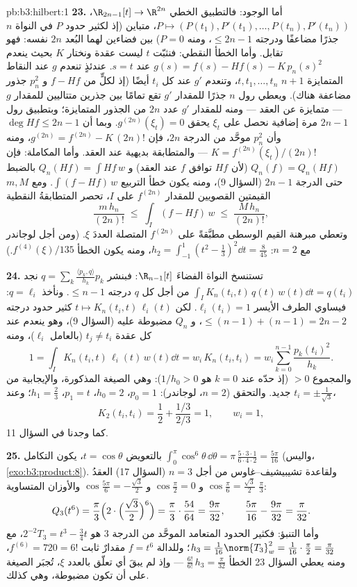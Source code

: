 \begin{solution}{pb:b3:hilbert:1}
\textbf{23.} أما الوجود: فالتطبيق الخطي $\R_{2n-1}[t] \to
\R^{2n}$، $P \mapsto (P(t_1), P'(t_1), \dots, P(t_n),
P'(t_n))$،
متباين (إذ لكثير حدود $P$ في النواة $n$ جذرًا مضاعفًا ودرجته
$\leq 2n - 1$، ومنه $P = 0$) بين فضاءين لهما البُعد $2n$ نفسه:
فهو تقابل. وأما الخطأ النقطي: فنثبّت $t$ ليست عقدة ونختار $K$
بحيث ينعدم $g(s) = f(s) - Hf(s) -
K\,p_n(s)^2$ عند $s = t$. عندئذٍ تنعدم $g$ عند النقاط
المتمايزة $n + 1$ $t, t_1, \dots, t_n$، وتنعدم $g'$ عند كل $t_i$ أيضًا
(إذ لكلٍّ من $f - Hf$ و $p_n^2$ جذور مضاعفة هناك). ويعطي رول
$n$ جذرًا للمقدار $g'$ تقع تمامًا بين جذرين متتاليين للمقدار
$g$ --- متمايزة عن العقد --- ومنه للمقدار $g'$ عدد $2n$ من الجذور
المتمايزة؛ وبتطبيق رول $2n - 1$ مرة إضافية نحصل على $\xi_t$
يحقق $g^{(2n)}(\xi_t) = 0$. وبما أن $\deg Hf \leq 2n - 1$ وأن $p_n^2$ موحَّد من الدرجة
$2n$، فإن $g^{(2n)} = f^{(2n)} - K\,(2n)!$، ومنه $K =
f^{(2n)}(\xi_t)/(2n)!$ --- والمتطابقة بديهية عند
العقد. وأما المكاملة: فإن $Q_n(f) = Q_n(Hf)$ (لأن $Hf$ توافق $f$ عند
العقد) و $Q_n(Hf) = \int Hf\,w$ بالضبط حتى الدرجة $2n - 1$ (السؤال 9)، ومنه
يكون خطأ التربيع $\int(f - Hf)\,w$. ومع $m, M$ القيمتين القصويين للمقدار
$f^{(2n)}$ على $I$، تحصر المتطابقةُ النقطية
\[
\frac{m\,h_n}{(2n)!} \;\leq\; \int_I(f - Hf)\,w
\;\leq\; \frac{M\,h_n}{(2n)!} ,
\]
وتعطي مبرهنة القيم الوسطى مطبَّقةً على $f^{(2n)}$ المتصلة
العددَ $\xi$. (ومن أجل لوجاندر مع $n = 2$: $h_2
= \int_{-1}^1(t^2 - \frac13)^2\dd t = \frac8{45}$، ومنه يكون
الخطأ $f^{(4)}(\xi)/135$.)

\textbf{24.} تستنسخ النواة الفضاءَ $\R_{n-1}[t]$: فبنشر
$q = \sum_k\frac{\langle p_k, q\rangle}{h_k}p_k$ نجد $\int_I K_n(t_i, t)\,q(t)\,w(t)\dd t = q(t_i)$ من أجل كل $q$ درجته $\leq n - 1$. ونأخذ
$q = \ell_i$: فيساوي الطرف الأيسر $\ell_i(t_i) = 1$. لكن $t \mapsto K_n(t_i,
t)\,\ell_i(t)$ كثير
حدود درجته $\leq (n - 1) + (n
- 1) = 2n - 2$، و $Q_n$ مضبوطة عليه (السؤال 9)، وهو ينعدم
عند كل عقدة $t_j \neq t_i$ (بالعامل $\ell_i$)، ومنه
\[
1 = \int_I K_n(t_i, t)\,\ell_i(t)\,w(t)\dd t
= w_i\,K_n(t_i, t_i)
= w_i\sum_{k=0}^{n-1}\frac{p_k(t_i)^2}{h_k} .
\]
والمجموع $> 0$ (إذ حدّه عند $k = 0$ هو $1/h_0 > 0$): وهي
الصيغة المذكورة، والإيجابية من جديد. والتحقق ($n = 2$،
لوجاندر): $p_0 = 1$، $h_0 = 2$، $p_1 = t$، $h_1 = \frac23$؛
وعند $t_i = \pm\frac1{\sqrt3}$،
\[
K_2(t_i, t_i) = \frac12 + \frac{1/3}{2/3} = 1,
\qquad w_i = 1,
\]
كما وجدنا في السؤال 11.

\textbf{25.} بالتعويض $t = \cos\theta$، يكون التكامل
$\int_0^\pi\cos^6\theta\,\dd\theta =
\pi\,\frac{5\cdot3\cdot1}{6\cdot4\cdot2} = \frac{5\pi}{16}$
(واليس، \cref{exo:b3:product:8}). ولقاعدة تشيبيشيف--غاوس من أجل $n = 3$
(السؤال 17) العقدُ $\cos\frac\pi6 = \frac{\sqrt3}2$ و $\cos\frac\pi2 = 0$ و $\cos\frac{5\pi}6 = -\frac{\sqrt3}2$ والأوزان
المتساوية $\frac\pi3$:
\[
Q_3(t^6) = \frac\pi3\Bigl(2\cdot\Bigl(\frac{\sqrt3}2
\Bigr)^{6}\Bigr) = \frac\pi3\cdot\frac{54}{64}
= \frac{9\pi}{32},
\qquad
\frac{5\pi}{16} - \frac{9\pi}{32} = \frac\pi{32} .
\]
وأما التنبؤ: فكثير الحدود المتعامد الموحَّد من الدرجة $3$ هو
$2^{-2}T_3 = t^3 - \frac34t$، مع $h_3 =
\frac1{16}\norm{T_3}_w^2 = \frac1{16}\cdot\frac\pi2 =
\frac\pi{32}$؛ وللدالة $f = t^6$ مقدارٌ ثابت $f^{(6)} = 720 =
6!$، ومنه
يعطي السؤال 23 الخطأ $\frac{6!}{6!}\,h_3 =
\frac\pi{32}$ --- وإذ لم يبقَ أي تعلّق بالعدد $\xi$،
تُجبَر الصيغة على أن تكون مضبوطة، وهي كذلك.
\end{solution}
